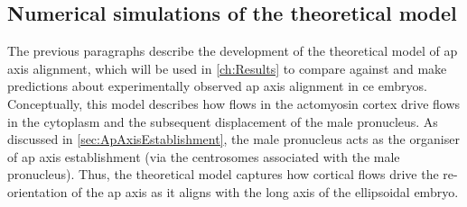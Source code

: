 \subsection{Numerical simulations of the theoretical model}\label{subsec:numericsModelMN}
The previous paragraphs describe the development of the theoretical model of \ac{ap} axis alignment, which will be used in \autoref{ch:Results} to compare against and make predictions about experimentally observed \ac{ap} axis alignment in \ac{ce} embryos. Conceptually, this model describes how flows in the actomyosin cortex drive flows in the cytoplasm and the subsequent displacement of the male pronucleus. As discussed in \autoref{sec:ApAxisEstablishment}, the male pronucleus acts as the organiser of \ac{ap} axis establishment (via the centrosomes associated with the male pronucleus). Thus, the theoretical model captures how cortical flows drive the re-orientation of the \ac{ap} axis as it aligns with the long axis of the ellipsoidal embryo. 

